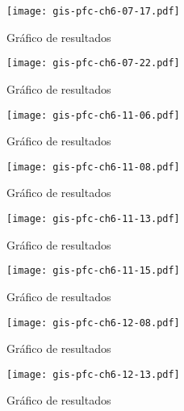 \documentclass[a4paper,12pt]				{article}
\begin{document}
\begin{figure}
	\begin{center}
		\texttt{[image: gis-pfc-ch6-07-17.pdf]}
	\end{center}
	\caption{Gráfico de resultados}
	\label{fig:gis-pfc-ch6-07-17}
\end{figure}

\begin{figure}
	\begin{center}
		\texttt{[image: gis-pfc-ch6-07-22.pdf]}
	\end{center}
	\caption{Gráfico de resultados}
	\label{fig:gis-pfc-ch6-07-22}
\end{figure}

\begin{figure}
	\begin{center}
		\texttt{[image: gis-pfc-ch6-11-06.pdf]}
	\end{center}
	\caption{Gráfico de resultados}
	\label{fig:gis-pfc-ch6-11-06}
\end{figure}

\begin{figure}
	\begin{center}
		\texttt{[image: gis-pfc-ch6-11-08.pdf]}
	\end{center}
	\caption{Gráfico de resultados}
	\label{fig:gis-pfc-ch6-11-08}
\end{figure}

\begin{figure}
	\begin{center}
		\texttt{[image: gis-pfc-ch6-11-13.pdf]}
	\end{center}
	\caption{Gráfico de resultados}
	\label{fig:gis-pfc-ch6-11-13}
\end{figure}

\begin{figure}
	\begin{center}
		\texttt{[image: gis-pfc-ch6-11-15.pdf]}
	\end{center}
	\caption{Gráfico de resultados}
	\label{fig:gis-pfc-ch6-11-15}
\end{figure}

\begin{figure}
	\begin{center}
		\texttt{[image: gis-pfc-ch6-12-08.pdf]}
	\end{center}
	\caption{Gráfico de resultados}
	\label{fig:gis-pfc-ch6-12-08}
\end{figure}

\begin{figure}
	\begin{center}
		\texttt{[image: gis-pfc-ch6-12-13.pdf]}
	\end{center}
	\caption{Gráfico de resultados}
	\label{fig:gis-pfc-ch6-12-13}
\end{figure}
\end{document}
